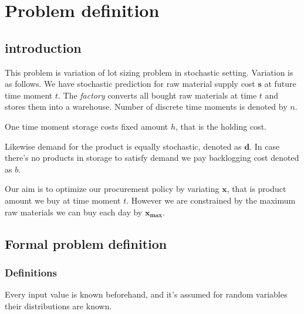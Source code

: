 
\chapter{Problem definition}
\section{introduction}

This problem is variation of lot sizing problem in stochastic setting. Variation is as follows. We have stochastic prediction for raw material supply cost $\mathbf{s}$ at future time moment $t$. The \emph{factory} converts all bought raw materials at time $t$ and stores them into a warehouse. Number of discrete time moments is denoted by $n$.

One time moment storage costs fixed amount $h$, that is the holding cost.

Likewise demand for the product is equally stochastic, denoted as $\mathbf{d}$. In case there's no products in storage to satisfy demand we pay backlogging cost denoted as $b$.

Our aim is to optimize our procurement policy by variating $\mathbf{x}$, that is product amount we buy at time moment $t$. However we are constrained by the maximum raw materials we can buy each day by $\mathbf{x_{\text{max}}}$.

\section{Formal problem definition}
\label{sec:Formal problem definition}

\subsection{Definitions}
\label{sub:Definitions}

Every input value is known beforehand, and it's assumed for random variables their distributions are known.

